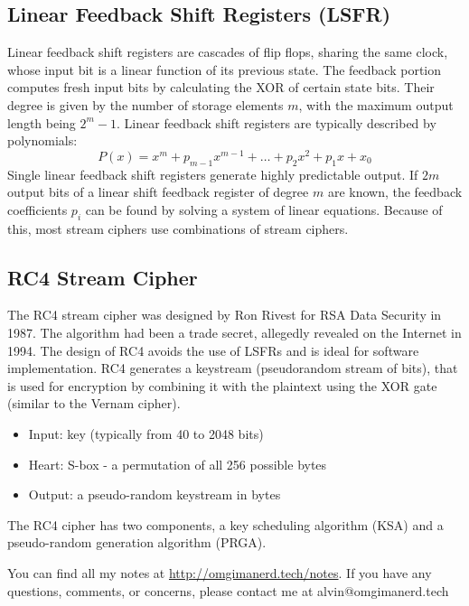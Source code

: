 \documentclass{math}
\begin{document}
\subsection*{Linear Feedback Shift Registers (LSFR)}
Linear feedback shift registers are cascades of flip flops, sharing the same
clock, whose input bit is a linear function of its previous state. The feedback
portion computes fresh input bits by calculating the XOR of certain state bits.
Their degree is given by the number of storage elements \( m \), with the
maximum output length being \( 2^m-1 \). Linear feedback shift registers are
typically described by polynomials:
\[ P(x) = x^m+p_{m-1}x^{m-1}+\dots+p_2x^2+p_1x+x_0 \]
Single linear feedback shift registers generate highly predictable output. If
\( 2m \) output bits of a linear shift feedback register of degree \( m \) are
known, the feedback coefficients \( p_i \) can be found by solving a system of
linear equations. Because of this, most stream ciphers use combinations of
stream ciphers.

\subsection*{RC4 Stream Cipher}
The RC4 stream cipher was designed by Ron Rivest for RSA Data Security in 1987.
The algorithm had been a trade secret, allegedly revealed on the Internet in
1994. The design of RC4 avoids the use of LSFRs and is ideal for software
implementation. RC4 generates a keystream (pseudorandom stream of bits), that is
used for encryption by combining it with the plaintext using the XOR gate
(similar to the Vernam cipher).
\begin{itemize}
  \item Input: key (typically from 40 to 2048 bits)
  \item Heart: S-box - a permutation of all 256 possible bytes
  \item Output: a pseudo-random keystream in bytes
\end{itemize}
The RC4 cipher has two components, a key scheduling algorithm (KSA) and a
pseudo-random generation algorithm (PRGA).

\begin{center}
  You can find all my notes at \url{http://omgimanerd.tech/notes}. If you have
  any questions, comments, or concerns, please contact me at
  alvin@omgimanerd.tech
\end{center}
\end{document}
